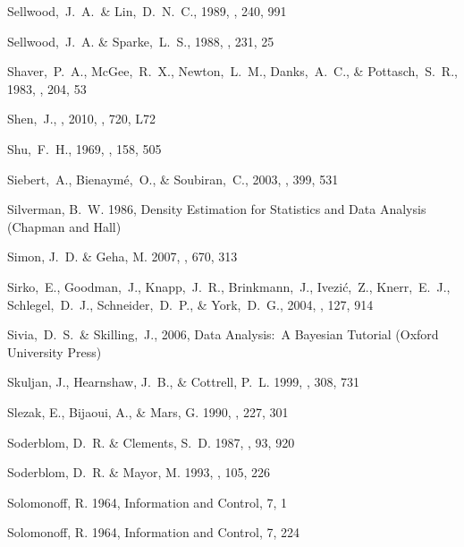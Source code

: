 \begin{thebibliography}{99}
  Sellwood,~J.~A.~\& Lin,~D.~N.~C., 1989,
  \mnras, 240, 991

  Sellwood,~J.~A. \& Sparke,~L.~S., 1988,
  \mnras, 231, 25

  Shaver,~P.~A., McGee,~R.~X., Newton,~L.~M., Danks,~A.~C., \& Pottasch,~S.~R., 1983,
  \mnras, 204, 53

  Shen,~J., \etal, 2010, \apj, 720, L72

  Shu,~F.~H., 1969,
  \apj, 158, 505

  Siebert,~A., Bienaym\'{e},~O., \& Soubiran,~C., 2003, \aap, 399, 531

{Silverman}, B.~W. 1986, {Density Estimation for Statistics and Data Analysis}
  ({Chapman and Hall})


{Simon}, J.~D. \& {Geha}, M. 2007, \apj, 670, 313

 Sirko,~E., Goodman,~J., Knapp,~J.~R., Brinkmann,~J., Ivezi\'{c},~Z., Knerr,~E.~J., Schlegel,~D.~J., Schneider,~D.~P., \& York,~D.~G., 2004,
  \aj, 127, 914

  Sivia,~D.~S.~\& Skilling,~J., 2006,
  Data Analysis:\ A Bayesian Tutorial (Oxford University Press)

{Skuljan}, J., {Hearnshaw}, J.~B., \& {Cottrell}, P.~L. 1999, \mnras, 308, 731

{Slezak}, E., {Bijaoui}, A., \& {Mars}, G. 1990, \aap, 227, 301

{Soderblom}, D.~R. \& {Clements}, S.~D. 1987, \aj, 93, 920

{Soderblom}, D.~R. \& {Mayor}, M. 1993, \aj, 105, 226

{Solomonoff}, R. 1964{}, {Information and Control}, 7, 1

{Solomonoff}, R. 1964{}, {Information and Control}, 7, 224


\end{thebibliography}
